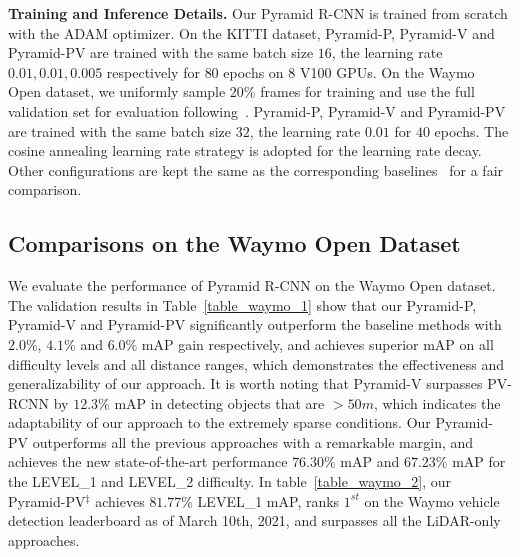 \documentclass[10pt,twocolumn,letterpaper]{article}
\begin{document}
\noindent\textbf{Training and Inference Details.} Our Pyramid R-CNN is trained from scratch with the ADAM optimizer. On the KITTI dataset, Pyramid-P, Pyramid-V and Pyramid-PV are trained with the same batch size $16$, the learning rate $0.01, 0.01, 0.005$ respectively for $80$ epochs on $8$ V100 GPUs. On the Waymo Open dataset, we uniformly sample $20\%$ frames for training and use the full validation set for evaluation following~\cite{shi2020pv}. Pyramid-P, Pyramid-V and Pyramid-PV are trained with the same batch size $32$, the learning rate $0.01$ for $40$ epochs. The cosine annealing learning rate strategy is adopted for the learning rate decay. Other configurations are kept the same as the corresponding baselines~\cite{shi2019pointrcnn, shi2020points, shi2020pv} for a fair comparison.

\vspace{-1mm}
\subsection{Comparisons on the Waymo Open Dataset} \label{3D Detection on the Waymo Open Dataset}
\vspace{-1mm}

We evaluate the performance of Pyramid R-CNN on the Waymo Open dataset. The validation results in Table~\ref{table_waymo_1} show that our Pyramid-P, Pyramid-V and Pyramid-PV significantly outperform the baseline methods with $2.0\%$, $4.1\%$ and $6.0\%$ mAP gain respectively, and achieves superior mAP on all difficulty levels and all distance ranges, which demonstrates the effectiveness and generalizability of our approach. It is worth noting that Pyramid-V surpasses PV-RCNN by $12.3\%$ mAP in detecting objects that are $>50m$, which indicates the adaptability of our approach to the extremely sparse conditions. Our Pyramid-PV outperforms all the previous approaches with a remarkable margin, and achieves the new state-of-the-art performance $76.30\%$ mAP and $67.23\%$ mAP for the LEVEL\_1 and LEVEL\_2 difficulty. In table~\ref{table_waymo_2}, our Pyramid-PV$^{\ddag}$ achieves $81.77\%$ LEVEL\_1 mAP, ranks $1^{st}$ on the Waymo vehicle detection leaderboard as of March 10th, 2021, and surpasses all the LiDAR-only approaches.
\end{document}

